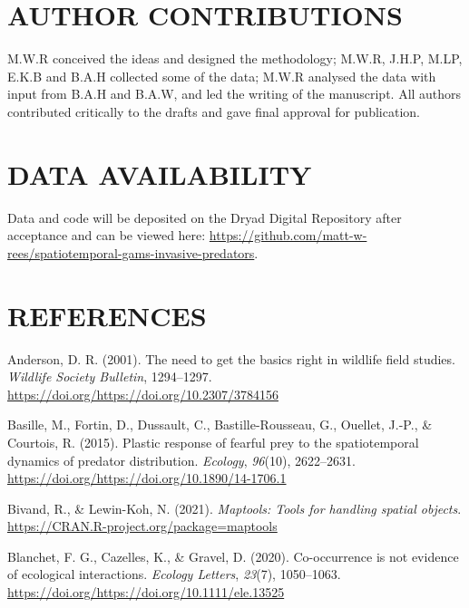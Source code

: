 \documentclass[]{elsarticle} %
\begin{document}
\hypertarget{author-contributions}{%
\section*{AUTHOR CONTRIBUTIONS}\label{author-contributions}}

M.W.R conceived the ideas and designed the methodology; M.W.R, J.H.P, M.LP, E.K.B and B.A.H collected some of the data; M.W.R analysed the data with input from B.A.H and B.A.W, and led the writing of the manuscript. All authors contributed critically to the drafts and gave final approval for publication.

\hypertarget{data-availability}{%
\section*{DATA AVAILABILITY}\label{data-availability}}

Data and code will be deposited on the Dryad Digital Repository after acceptance and can be viewed here: \url{https://github.com/matt-w-rees/spatiotemporal-gams-invasive-predators}.

\newpage

\hypertarget{references}{%
\section*{REFERENCES}\label{references}}

\hypertarget{refs}{}
\leavevmode\hypertarget{ref-anderson2001need}{}%
Anderson, D. R. (2001). The need to get the basics right in wildlife field studies. \emph{Wildlife Society Bulletin}, 1294--1297. \url{https://doi.org/https://doi.org/10.2307/3784156}

\leavevmode\hypertarget{ref-basille2015plastic}{}%
Basille, M., Fortin, D., Dussault, C., Bastille-Rousseau, G., Ouellet, J.-P., \& Courtois, R. (2015). Plastic response of fearful prey to the spatiotemporal dynamics of predator distribution. \emph{Ecology}, \emph{96}(10), 2622--2631. \url{https://doi.org/https://doi.org/10.1890/14-1706.1}

\leavevmode\hypertarget{ref-maptools}{}%
Bivand, R., \& Lewin-Koh, N. (2021). \emph{Maptools: Tools for handling spatial objects}. \url{https://CRAN.R-project.org/package=maptools}

\leavevmode\hypertarget{ref-guillaume2020co}{}%
Blanchet, F. G., Cazelles, K., \& Gravel, D. (2020). Co-occurrence is not evidence of ecological interactions. \emph{Ecology Letters}, \emph{23}(7), 1050--1063. \url{https://doi.org/https://doi.org/10.1111/ele.13525}
\end{document}
